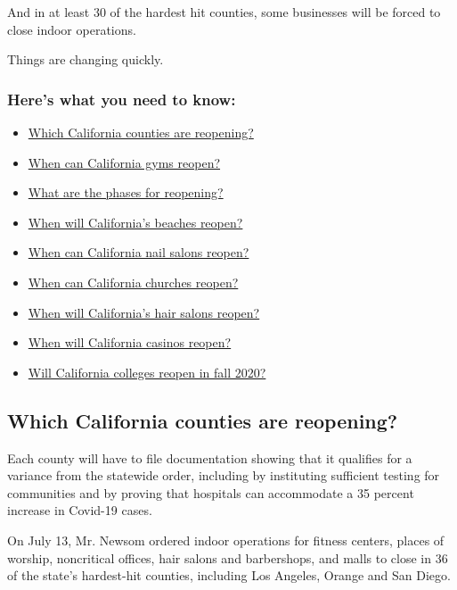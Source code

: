And in at least 30 of the hardest hit counties, some businesses will be
forced to close indoor operations.

Things are changing quickly.

\hypertarget{heres-what-you-need-to-know}{%
\subsubsection{Here's what you need to
know:}\label{heres-what-you-need-to-know}}

\begin{itemize}
\tightlist
\item
  \protect\hyperlink{link-62d4b749}{Which California counties are
  reopening?}
\item
  \protect\hyperlink{link-6647996c}{When can California gyms reopen?}
\item
  \protect\hyperlink{link-6a93b96c}{What are the phases for reopening?}
\item
  \protect\hyperlink{link-5261ebea}{When will California's beaches
  reopen?}
\item
  \protect\hyperlink{link-545ba980}{When can California nail salons
  reopen?}
\item
  \protect\hyperlink{link-46722957}{When can California churches
  reopen?}
\item
  \protect\hyperlink{link-d8be7ad}{When will California's hair salons
  reopen?}
\item
  \protect\hyperlink{link-7ecf25e0}{When will California casinos
  reopen?}
\item
  \protect\hyperlink{link-5ee6204a}{Will California colleges reopen in
  fall 2020?}
\end{itemize}

\hypertarget{which-california-counties-are-reopening}{%
\subsection{Which California counties are
reopening?}\label{which-california-counties-are-reopening}}

Each county will have to file documentation showing that it qualifies
for a variance from the statewide order, including by instituting
sufficient testing for communities and by proving that hospitals can
accommodate a 35 percent increase in Covid-19 cases.

On July 13, Mr. Newsom ordered indoor operations for fitness centers,
places of worship, noncritical offices, hair salons and barbershops, and
malls to close in 36 of the state's hardest-hit counties, including Los
Angeles, Orange and San Diego.

